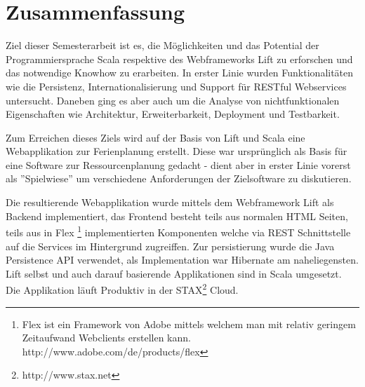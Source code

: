 \chapter*{Zusammenfassung}
Ziel dieser Semesterarbeit ist es, die M\"oglichkeiten und das Potential der Programmiersprache Scala respektive des Webframeworks Lift zu erforschen und das notwendige Knowhow zu erarbeiten. In erster Linie wurden Funktionalit\"aten wie die Persistenz, Internationalisierung und Support f\"ur RESTful Webservices untersucht. Daneben ging es aber auch um die Analyse von nichtfunktionalen Eigenschaften wie Architektur, Erweiterbarkeit, Deployment und Testbarkeit.

Zum Erreichen dieses Ziels wird auf der Basis von Lift und Scala eine Webapplikation zur Ferienplanung erstellt. Diese war urspr\"unglich als Basis f\"ur eine Software zur Ressourcenplanung gedacht - dient aber in erster Linie vorerst als ''Spielwiese'' um verschiedene Anforderungen der Zielsoftware zu diskutieren.

Die resultierende Webapplikation wurde mittels dem Webframework Lift als Backend implementiert, das Frontend besteht teils aus normalen HTML Seiten, teils aus in Flex \footnote{Flex ist ein Framework von Adobe mittels welchem man mit relativ geringem Zeitaufwand Webclients erstellen kann. http://www.adobe.com/de/products/flex} implementierten Komponenten welche via REST Schnittstelle auf die Services im Hintergrund zugreiffen. Zur persistierung wurde die Java Persistence API verwendet, als Implementation war Hibernate am naheliegensten. Lift selbst und auch darauf basierende Applikationen sind in Scala umgesetzt. Die Applikation l\"auft Produktiv in der STAX\footnote{http://www.stax.net} Cloud.